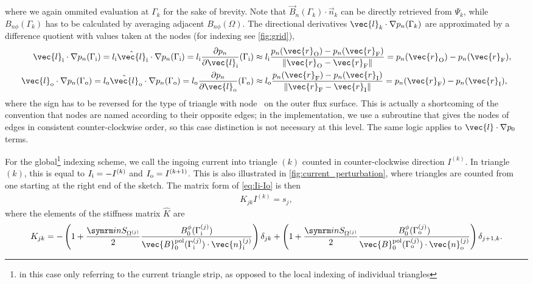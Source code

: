 where we again ommited evaluation at $\Gamma_{k}$ for the sake of brevity. Note that $\vec{B}_{n} (\Gamma_{k}) \cdot \vec{n}_{k}$ can be directly retrieved from $\Psi_{k}$, while $B_{n \phi} (\Gamma_{k})$ has to be calculated by averaging adjacent $B_{n \phi} (\Omega)$. The directional derivatives $\vec{l}_{k} \cdot \grad p_{n} (\Gamma_{k})$ are approximated by a difference quotient with values taken at the nodes (for indexing see \cref{fig:grid}),
\begin{align}
  \vec{l}_{\inw} \cdot \grad p_{n} (\Gamma_{\inw}) = l_{\inw} \hat{\vec{l}}_{\inw} \cdot \grad p_{n} (\Gamma_{\inw}) = l_{\inw} \pd[p_{n}]{\vec{l}_{\inw}} (\Gamma_{\inw}) & \approx l_{\inw} \frac{p_{n} (\vec{r}_{\vout}) - p_{n} (\vec{r}_{\vfs})}{\norm{\vec{r}_{\vout} - \vec{r}_{\vfs}}} = p_{n} (\vec{r}_{\vout}) - p_{n} (\vec{r}_{\vfs}), \\
  \vec{l}_{\out} \cdot \grad p_{n} (\Gamma_{\out}) = l_{\out} \hat{\vec{l}}_{\out} \cdot \grad p_{n} (\Gamma_{\out}) = l_{\out} \pd[p_{n}]{\vec{l}_{\out}} (\Gamma_{\out}) & \approx l_{\out} \frac{p_{n} (\vec{r}_{\vfs}) - p_{n} (\vec{r}_{\vinw})}{\norm{\vec{r}_{\vfs} - \vec{r}_{\vinw}}} = p_{n} (\vec{r}_{\vfs}) - p_{n} (\vec{r}_{\vinw}),
\end{align}
where the sign has to be reversed for the type of triangle with node \vfs\ on the outer flux surface. This is actually a shortcoming of the convention that nodes are named according to their opposite edges; in the implementation, we use a subroutine that gives the nodes of edges in consistent counter-clockwise order, so this case distinction is not necessary at this level. The same logic applies to $\vec{l} \cdot \grad p_{0}$ terms.

For the global\footnote{in this case only referring to the current triangle strip, as opposed to the local indexing of individual triangles} indexing scheme, we call the ingoing current into triangle $(k)$ counted in counter-clockwise direction $I^{(k)}$. In triangle $(k)$, this is equal to $I_{\textrm{i}} = -I^{(k)}$ and $I_{\textrm{o}} = I^{(k+1)}$. This is also illustrated in \cref{fig:current_perturbation}, where triangles are counted from one starting at the right end of the sketch. The matrix form of \cref{eq:Ii-Io} is then
\begin{gather}
  K_{jk} I^{(k)} = s_{j},
\end{gather}
where the elements of the stiffness matrix $\hat{K}$ are
\begin{gather}
  K_{jk} = -\left ( 1 + \frac{\im n S_{\Omega^{(j)}}}{2} \frac{B_{0}^{\phi} (\Gamma_{\inw}^{(j)})}{\vec{B}_{0}^{\pol} (\Gamma_{\inw}^{(j)}) \cdot \vec{n}_{\inw}^{(j)}} \right) \delta_{jk} + \left( 1 + \frac{\im n S_{\Omega^{(j)}}}{2} \frac{B_{0}^{\phi} (\Gamma_{\out}^{(j)})}{\vec{B}_{0}^{\pol} (\Gamma_{\out}^{(j)}) \cdot \vec{n}_{\out}^{(j)}} \right) \delta_{j+1, k}.
\end{gather}

